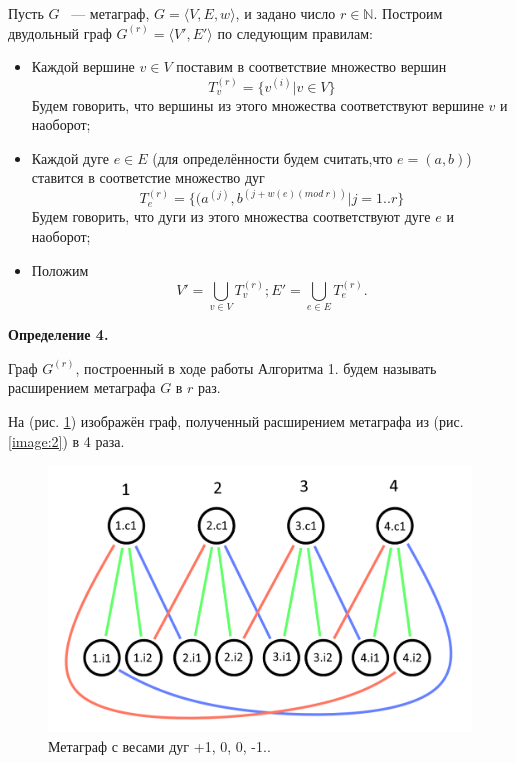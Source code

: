 \documentclass[14pt]{mmcs-article}
\begin{document}
Пусть $G$ ~--- метаграф, $G = \langle V, E, w \rangle$, и задано число $r \in \mathbb{N}$. Построим двудольный граф $G^{(r)} = \langle V', E' \rangle$ по следующим правилам:




\begin{itemize}
    \item Каждой вершине $v \in V$ поставим в соответствие множество вершин 
    \[
        T^{(r)}_v = \{ v^{(i)} | v \in V \}
    \]
    Будем говорить, что вершины из этого множества соответствуют вершине $v$ и наоборот;
    
    \item Каждой дуге $e \in E$ (для определённости будем считать,что $e = (a, b)$) ставится в соответстие множество дуг 
    \[
        T^{(r)}_e = \{ (a^{(j)}, b^{(j + w(e) (mod\ r))} | j = 1..r \}
    \]
    Будем говорить, что дуги из этого множества соответствуют дуге $e$ и наоборот;
    \item Положим 
    \[
        V' = \bigcup_{v \in V} T^{(r)}_v; E' = \bigcup_{e \in E} T^{(r)}_e.
    \]
\end{itemize}

\textbf{Определение 4.}

Граф $G^{(r)}$, построенный в ходе работы Алгоритма 1. будем называть расширением метаграфа $G$ в $r$ раз.

На (рис. \ref{image:3}) изображён граф, полученный расширением метаграфа из (рис. \ref{image:2}) в 4 раза.

\begin{figure}[H]
    \centering
    \includegraphics[scale=0.4]{Fig_1.png}
    \caption{ Метаграф с весами дуг +1, 0, 0, -1.. }
    \label{image:3}
\end{figure}
\end{document}
